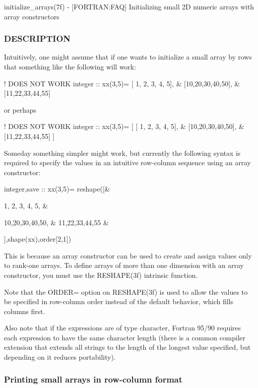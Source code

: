 initialize\+\_\+arrays(7f) -\/ \mbox{[}F\+O\+R\+T\+R\+AN\+:F\+AQ\mbox{]} Initializing small 2D numeric arrays with array constructors \subsubsection*{D\+E\+S\+C\+R\+I\+P\+T\+I\+ON}

Intuitively, one might assume that if one wants to initialize a small array by rows that something like the following will work\+:

! D\+O\+ES N\+OT W\+O\+RK integer \+:\+: xx(3,5)= \mbox{[} 1, 2, 3, 4, 5\mbox{]}, \& \mbox{[}10,20,30,40,50\mbox{]}, \& \mbox{[}11,22,33,44,55\mbox{]}

or perhaps

! D\+O\+ES N\+OT W\+O\+RK integer \+:\+: xx(3,5)= \mbox{[} \mbox{[} 1, 2, 3, 4, 5\mbox{]}, \& \mbox{[}10,20,30,40,50\mbox{]}, \& \mbox{[}11,22,33,44,55\mbox{]} \mbox{]}

Someday something simpler might work, but currently the following syntax is required to specify the values in an intuitive row-\/column sequence using an array constructor\+:

integer,save \+:\+: xx(3,5)= reshape(\mbox{[}\& \begin{DoxyVerb}1, 2, 3, 4, 5, &
\end{DoxyVerb}
 10,20,30,40,50, \& 11,22,33,44,55 \&

\mbox{]},shape(xx),order\mbox{[}2,1\mbox{]})

This is because an array constructor can be used to create and assign values only to rank-\/one arrays. To define arrays of more than one dimension with an array constructor, you must use the R\+E\+S\+H\+A\+P\+E(3f) intrinsic function.

Note that the O\+R\+D\+ER= option on R\+E\+S\+H\+A\+P\+E(3f) is used to allow the values to be specified in row-\/column order instead of the default behavior, which fills columns first.

Also note that if the expressions are of type character, Fortran 95/90 requires each expression to have the same character length (there is a common compiler extension that extends all strings to the length of the longest value specified, but depending on it reduces portability).

\subsubsection*{Printing small arrays in row-\/column format}

